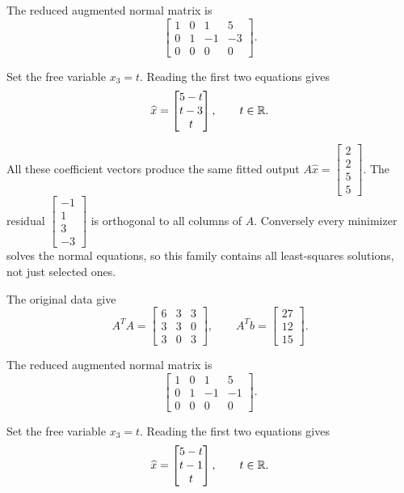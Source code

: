 The reduced augmented normal matrix is
\[ \begin{bmatrix}1 & 0 & 1 & 5\\0 & 1 & -1 & -3\\0 & 0 & 0 & 0\end{bmatrix}.\]

Set the free variable $x_3=t$. Reading the first two equations gives
\[ \widehat x=\begin{bmatrix}5 - t\\t - 3\\t\end{bmatrix},\qquad t\in\mathbb{R}.\]

All these coefficient vectors produce the same fitted output $A\widehat x=\begin{bmatrix}2\\2\\5\\5\end{bmatrix}$. The residual $\begin{bmatrix}-1\\1\\3\\-3\end{bmatrix}$ is orthogonal to all columns of $A$. Conversely every minimizer solves the normal equations, so this family contains all least-squares solutions, not just selected ones.

The original data give
\[ A^TA=\begin{bmatrix}6 & 3 & 3\\3 & 3 & 0\\3 & 0 & 3\end{bmatrix},\qquad A^Tb=\begin{bmatrix}27\\12\\15\end{bmatrix}.\]

The reduced augmented normal matrix is
\[ \begin{bmatrix}1 & 0 & 1 & 5\\0 & 1 & -1 & -1\\0 & 0 & 0 & 0\end{bmatrix}.\]

Set the free variable $x_3=t$. Reading the first two equations gives
\[ \widehat x=\begin{bmatrix}5 - t\\t - 1\\t\end{bmatrix},\qquad t\in\mathbb{R}.\]

